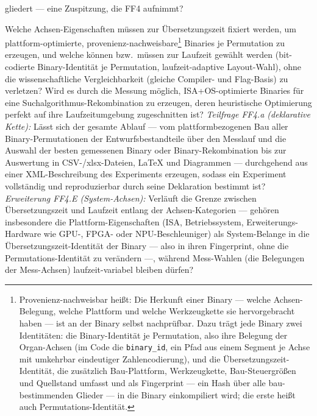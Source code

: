 \begin{description}
  gliedert --- eine Zuspitzung, die FF4 aufnimmt?
  \item[FF4 (Compile-Time vs.\ Laufzeit)] Welche Achsen-Eigenschaften müssen zur Übersetzungszeit
  fixiert werden, um plattform-optimierte, provenienz-nachweisbare\footnote{Provenienz-nachweisbar
  heißt: Die Herkunft einer Binary --- welche Achsen-Belegung, welche Plattform und welche
  Werkzeugkette sie hervorgebracht haben --- ist an der Binary selbst nachprüfbar. Dazu trägt jede
  Binary zwei Identitäten: die Binary-Identität je Permutation, also ihre Belegung der Organ-Achsen
  (im Code die \texttt{binary\_id}, ein Pfad aus einem Segment je Achse mit umkehrbar eindeutiger
  Zahlencodierung), und die Übersetzungszeit-Identität, die zusätzlich Bau-Plattform, Werkzeugkette,
  Bau-Steuergrößen und Quellstand umfasst und als Fingerprint --- ein Hash über alle
  bau-bestimmenden Glieder --- in die Binary einkompiliert wird; die erste heißt auch
  Permutations-Identität.} Binaries je Permutation zu
  erzeugen, und welche können bzw.\ müssen zur Laufzeit gewählt werden (bit-codierte
  Binary-Identität je Permutation, laufzeit-adaptive Layout-Wahl), ohne die wissenschaftliche
  Vergleichbarkeit (gleiche Compiler- und Flag-Basis) zu verletzen? Wird es durch die Messung möglich,
  ISA+OS-optimierte Binaries für eine Suchalgorithmus-Rekombination zu erzeugen, deren heuristische
  Optimierung perfekt auf ihre Laufzeitumgebung zugeschnitten ist?
  \emph{Teilfrage FF4.a (deklarative Kette):} Lässt sich der gesamte Ablauf --- vom plattformbezogenen
  Bau aller Binary-Permutationen der Entwurfsbestandteile über den Messlauf und die Auswahl der besten
  gemessenen Binary oder Binary-Rekombination bis zur Auswertung in CSV-/xlsx-Dateien, LaTeX und
  Diagrammen --- durchgehend aus einer XML-Beschreibung des Experiments erzeugen, sodass ein
  Experiment vollständig und reproduzierbar durch seine Deklaration bestimmt ist?
  \emph{Erweiterung FF4.E (System-Achsen):} Verläuft die Grenze zwischen Übersetzungszeit und Laufzeit
  entlang der Achsen-Kategorien --- gehören insbesondere die Plattform-Eigenschaften (ISA,
  Betriebssystem, Erweiterungs-Hardware wie GPU-, FPGA- oder NPU-Beschleuniger) als System-Belange in
  die Übersetzungszeit-Identität der
  Binary --- also in ihren Fingerprint, ohne die Permutations-Identität zu verändern ---, während
  Mess-Wahlen (die Belegungen der Mess-Achsen) laufzeit-variabel bleiben dürfen?
\end{description}

